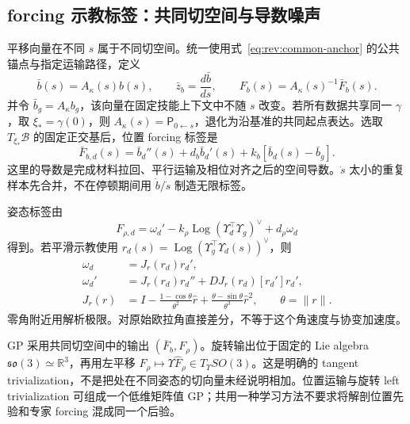 \documentclass[11pt,a4paper]{article}
\numberwithin{equation}{section}
\theoremstyle{definition}
\newcommand{\R}{\mathbb R}
\begin{document}
\subsection{forcing 示教标签：共同切空间与导数噪声}
平移向量在不同 $s$ 属于不同切空间。统一使用式~\eqref{eq:rev:common-anchor} 的公共锚点与指定运输路径，定义
\begin{equation}
 \bar b(s)=A_\kappa(s)b(s),\qquad
 \bar z_b=\frac{d\bar b}{ds},\qquad
 F_b(s)=A_\kappa(s)^{-1}\bar F_b(s).
 \label{eq:v43-common-tangent}
\end{equation}
并令 $\bar b_g=A_\kappa b_g$，该向量在固定技能上下文中不随 $s$ 改变。若所有数据共享同一 $\gamma$，取 $\xi_*=\gamma(0)$，则 $A_\kappa(s)=\mathsf P_{0\leftarrow s}$，退化为沿基准的共同起点表达。选取 $T_{\xi_*}\mathcal B$ 的固定正交基后，位置 forcing 标签是
\begin{equation}
 \boxed{\bar F_{b,d}(s)=\bar b_d''(s)
      +d_b\bar b_d'(s)+k_b[\bar b_d(s)-\bar b_g].}
 \label{eq:v43-position-label}
\end{equation}
这里的导数是完成材料拉回、平行运输及相位对齐之后的空间导数。$\dot s$ 太小的重复样本先合并，不在停顿期间用 $\dot b/\dot s$ 制造无限标签。

姿态标签由
\begin{equation}
 \boxed{F_{\rho,d}=\omega_d'
       -k_\rho\operatorname{Log}(\Upsilon_d^\top\Upsilon_g)^\vee
       +d_\rho\omega_d}
 \label{eq:v43-orientation-label}
\end{equation}
得到。若平滑示教使用 $r_d(s)=\operatorname{Log}(\Upsilon_g^\top\Upsilon_d(s))^\vee$，则
\begin{align}
 \omega_d&=J_r(r_d)r_d',\\
 \omega_d'&=J_r(r_d)r_d''+
              DJ_r(r_d)[r_d']r_d',\\
 J_r(r)&=I-\frac{1-\cos\theta}{\theta^2}\widehat r
              +\frac{\theta-\sin\theta}{\theta^3}\widehat r^2,
       \qquad\theta=\|r\|.
 \label{eq:v43-right-jacobian}
\end{align}
零角附近用解析极限。对原始欧拉角直接差分，不等于这个角速度与协变加速度。

GP 采用共同切空间中的输出 $(\bar F_b,F_\rho)$。旋转输出位于固定的 Lie algebra $\mathfrak{so}(3)\simeq\R^3$，再用左平移 $F_\rho\mapsto\Upsilon\widehat F_\rho\in T_\Upsilon SO(3)$。这是明确的 tangent trivialization，不是把处在不同姿态的切向量未经说明相加。位置运输与旋转 left trivialization 可组成一个低维矩阵值 GP；共用一种学习方法不要求将解剖位置先验和专家 forcing 混成同一个后验。
\end{document}
